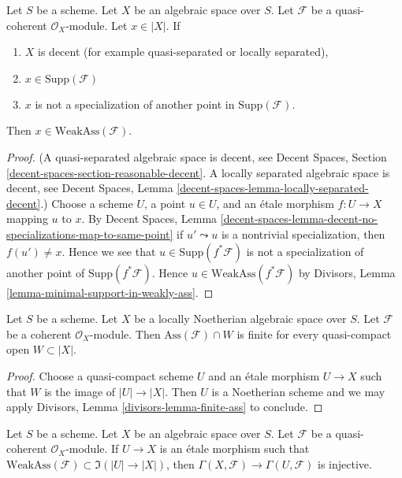 \begin{lemma}
\label{lemma-minimal-support-in-weakly-ass-decent}
Let $S$ be a scheme. Let $X$ be an algebraic space over $S$.
Let $\mathcal{F}$ be a quasi-coherent $\mathcal{O}_X$-module.
Let $x \in |X|$. If
\begin{enumerate}
\item $X$ is decent (for example quasi-separated or locally separated),
\item $x \in \text{Supp}(\mathcal{F})$
\item $x$ is not a specialization of another point in
$\text{Supp}(\mathcal{F})$.
\end{enumerate}
Then $x \in \text{WeakAss}(\mathcal{F})$.
\end{lemma}

\begin{proof}
(A quasi-separated algebraic space is decent, see
Decent Spaces, Section \ref{decent-spaces-section-reasonable-decent}.
A locally separated algebraic space is decent, see
Decent Spaces, Lemma \ref{decent-spaces-lemma-locally-separated-decent}.)
Choose a scheme $U$, a point $u \in U$, and an \'etale morphism
$f : U \to X$ mapping $u$ to $x$. By
Decent Spaces, Lemma
\ref{decent-spaces-lemma-decent-no-specializations-map-to-same-point}
if $u' \leadsto u$ is a nontrivial specialization, then
$f(u') \not = x$. Hence we see that $u \in \text{Supp}(f^*\mathcal{F})$
is not a specialization of another point of
$\text{Supp}(f^*\mathcal{F})$.
Hence $u \in \text{WeakAss}(f^*\mathcal{F})$ by
Divisors, Lemma \ref{lemma-minimal-support-in-weakly-ass}.
\end{proof}

\begin{lemma}
\label{lemma-finite-ass}
Let $S$ be a scheme. Let $X$ be a locally Noetherian algebraic space over $S$.
Let $\mathcal{F}$ be a coherent $\mathcal{O}_X$-module.
Then $\text{Ass}(\mathcal{F}) \cap W$ is finite for
every quasi-compact open $W \subset |X|$.
\end{lemma}

\begin{proof}
Choose a quasi-compact scheme $U$ and an \'etale morphism $U \to X$
such that $W$ is the image of $|U| \to |X|$. Then $U$ is a
Noetherian scheme and we may apply
Divisors, Lemma \ref{divisors-lemma-finite-ass} to conclude.
\end{proof}

\begin{lemma}
\label{lemma-restriction-injective-open-contains-weakly-ass}
Let $S$ be a scheme. Let $X$ be an algebraic space over $S$.
Let $\mathcal{F}$ be a quasi-coherent $\mathcal{O}_X$-module.
If $U \to X$ is an \'etale morphism such that
$\text{WeakAss}(\mathcal{F}) \subset \Im(|U| \to |X|)$, then
$\Gamma(X, \mathcal{F}) \to \Gamma(U, \mathcal{F})$ is injective.
\end{lemma}

